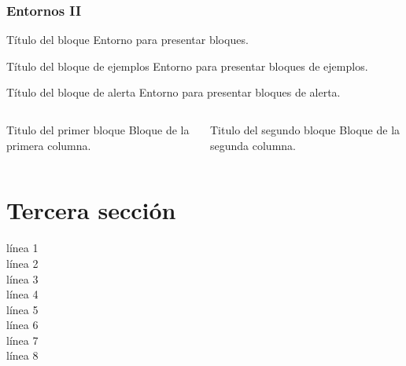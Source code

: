 \documentclass{beamer}
\begin{document}
\begin{frame}
    \frametitle{Entornos II}

    \begin{block}{Título del bloque}
        Entorno para presentar bloques.
    \end{block}

    \begin{exampleblock}{Título del bloque de ejemplos}
        Entorno para presentar bloques de ejemplos.
    \end{exampleblock}

    \begin{alertblock}{Título del bloque de alerta}
        Entorno para presentar bloques de alerta.
    \end{alertblock}

    \begin{columns}
            \begin{block}{Titulo del primer bloque}
                Bloque de la primera columna.
            \end{block}
            \begin{block}{Titulo del segundo bloque}
                Bloque de la segunda columna.
            \end{block}
    \end{columns}
\end{frame}


\section{Tercera sección}

\begin{frame}
    línea 1\\\pause
    línea 2\\\pause
    línea 3\\
    línea 4\\\pause[2]
    línea 5\\
    línea 6\\\pause[4]
    línea 7\\\pause[2]
    línea 8\\\pause
\end{frame}
\end{document}
